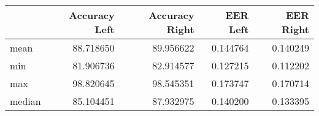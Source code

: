 \begin{tabular}{lrrrr}
\toprule
{} &  Accuracy Left &  Accuracy Right &  EER Left &  EER Right \\
\midrule
mean   &      88.718650 &       89.956622 &  0.144764 &   0.140249 \\
min    &      81.906736 &       82.914577 &  0.127215 &   0.112202 \\
max    &      98.820645 &       98.545351 &  0.173747 &   0.170714 \\
median &      85.104451 &       87.932975 &  0.140200 &   0.133395 \\
\bottomrule
\end{tabular}
